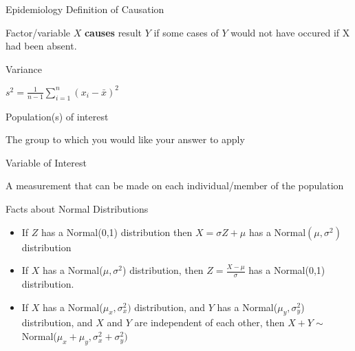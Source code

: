 \documentclass[12pt]{article}
\begin{document}
\begin{note}
    \begin{field}
        Epidemiology Definition of Causation
    \end{field}
    \begin{field}
        Factor/variable $X$ \textbf{causes} result $Y$ if some cases of $Y$ would not have occured if X had been absent.
    \end{field}
\end{note}

\begin{note}
    \begin{field}
        Variance
    \end{field}
    \begin{field}
        $s^2 = \frac{1}{n-1}\sum_{i=1}^n(x_i - \bar{x})^2$
    \end{field}
\end{note}

\begin{note}
    \begin{field}
        Population(s) of interest
    \end{field}
    \begin{field}
        The group to which you would like your answer to apply
    \end{field}
\end{note}

\begin{note}
    \begin{field}
        Variable of Interest
    \end{field}
    \begin{field}
        A measurement that can be made on each individual/member of the population
    \end{field}
\end{note}

\begin{note}
    \begin{field}
        Facts about Normal Distributions
    \end{field}
    \begin{field}
        \begin{itemize}
              \item If $Z$ has a Normal(0,1) distribution then $X = \sigma Z + \mu$ has a Normal$(\mu,\sigma^2)$ distribution
              \item If $X$ has a Normal($\mu,\sigma^2$) distribution, then $Z = \frac{X - \mu}{\sigma}$ has a Normal(0,1) distribution.
              \item If $X$ has a Normal($\mu_x,\sigma^2_x)$ distribution, and $Y$ has a Normal($\mu_y,\sigma_y^2$) distribution, and $X$ and $Y$ are independent of each other, then $X + Y \sim $ Normal($\mu_x + \mu_y, \sigma_x^2 + \sigma_y^2)$
            \end{itemize}
    \end{field}
\end{note}
\end{document}
